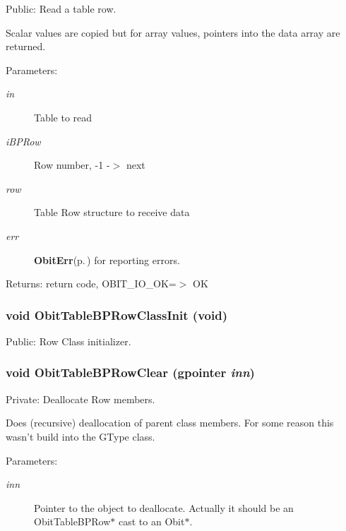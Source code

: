 Public: Read a table row. 

Scalar values are copied but for array values, pointers into the data array are returned. \begin{Desc}
\item[Parameters:]
\begin{description}
\item[{\em in}]Table to read \item[{\em i\-BPRow}]Row number, -1 -$>$ next \item[{\em row}]Table Row structure to receive data \item[{\em err}]{\bf Obit\-Err}{\rm (p.\,\pageref{structObitErr})} for reporting errors. \end{description}
\end{Desc}
\begin{Desc}
\item[Returns:]return code, OBIT\_\-IO\_\-OK=$>$ OK \end{Desc}
\subsubsection{\setlength{\rightskip}{0pt plus 5cm}void Obit\-Table\-BPRow\-Class\-Init (void)}\label{ObitTableBP_8c_a26}


Public: Row Class initializer. 

\subsubsection{\setlength{\rightskip}{0pt plus 5cm}void Obit\-Table\-BPRow\-Clear (gpointer {\em inn})}\label{ObitTableBP_8c_a7}


Private: Deallocate Row members. 

Does (recursive) deallocation of parent class members. For some reason this wasn't build into the GType class. \begin{Desc}
\item[Parameters:]
\begin{description}
\item[{\em inn}]Pointer to the object to deallocate. Actually it should be an Obit\-Table\-BPRow$\ast$ cast to an Obit$\ast$. \end{description}
\end{Desc}
